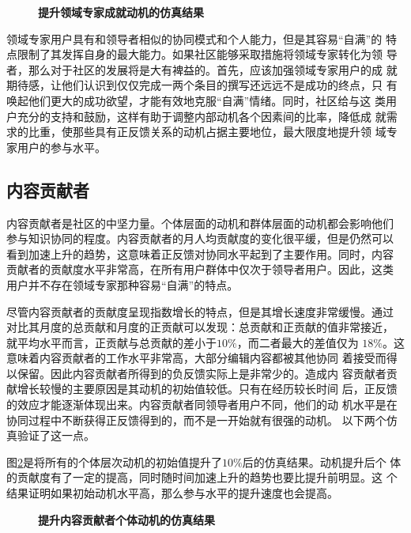 \begin{figure}[!htb]
  \centering
  \caption{\small{\textbf{提升领域专家成就动机的仿真结果}}}
   
  \label{fig:improve3}
\end{figure}

领域专家用户具有和领导者相似的协同模式和个人能力，但是其容易“自满”的
特点限制了其发挥自身的最大能力。如果社区能够采取措施将领域专家转化为领
导者，那么对于社区的发展将是大有裨益的。首先，应该加强领域专家用户的成
就期待感，让他们认识到仅仅完成一两个条目的撰写还远远不是成功的终点，只
有唤起他们更大的成功欲望，才能有效地克服“自满”情绪。同时，社区给与这
类用户充分的支持和鼓励，这样有助于调整内部动机各个因素间的比率，降低成
就需求的比重，使那些具有正反馈关系的动机占据主要地位，最大限度地提升领
域专家用户的参与水平。

\subsection{内容贡献者}

内容贡献者是社区的中坚力量。个体层面的动机和群体层面的动机都会影响他们
参与知识协同的程度。内容贡献者的月人均贡献度的变化很平缓，但是仍然可以
看到加速上升的趋势，这意味着正反馈对协同水平起到了主要作用。同时，内容
贡献者的贡献度水平非常高，在所有用户群体中仅次于领导者用户。因此，这类
用户并不存在领域专家那种容易“自满”的特点。

尽管内容贡献者的贡献度呈现指数增长的特点，但是其增长速度非常缓慢。通过
对比其月度的总贡献和月度的正贡献可以发现：总贡献和正贡献的值非常接近，
就平均水平而言，正贡献与总贡献的差小于$10\%$，而二者最大的差值仅为
$18\%$。这意味着内容贡献者的工作水平非常高，大部分编辑内容都被其他协同
着接受而得以保留。因此内容贡献者所得到的负反馈实际上是非常少的。造成内
容贡献者贡献增长较慢的主要原因是其动机的初始值较低。只有在经历较长时间
后，正反馈的效应才能逐渐体现出来。内容贡献者同领导者用户不同，他们的动
机水平是在协同过程中不断获得正反馈得到的，而不是一开始就有很强的动机。
以下两个仿真验证了这一点。

图\ref{fig:improve5}是将所有的个体层次动机的初始值提升了$10\%$后的仿真结果。动机提升后个
体的贡献度有了一定的提高，同时随时间加速上升的趋势也要比提升前明显。这
个结果证明如果初始动机水平高，那么参与水平的提升速度也会提高。

\begin{figure}[!htb]
  \centering
  
 \caption{\small{\textbf{提升内容贡献者个体动机的仿真结果}}}
  \label{fig:improve5}
\end{figure}

